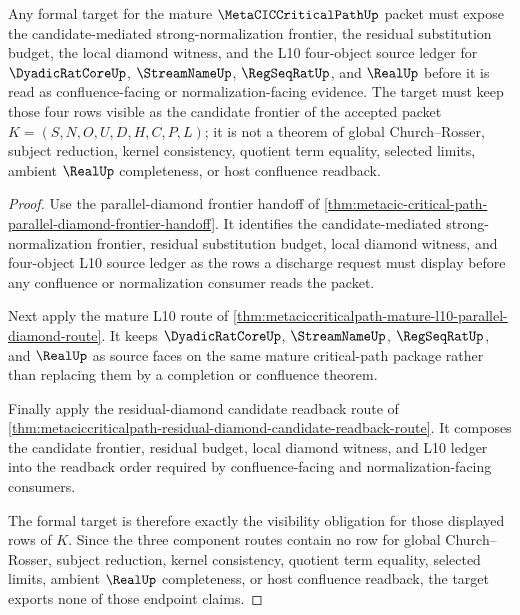 \begin{theorem}
\label{thm:metacic-critical-path-parallel-diamond-candidate-frontier-formal-target}
Any formal target for the mature $\MetaCICCriticalPathUp$ packet must expose the candidate-mediated strong-normalization frontier, the residual substitution budget, the local diamond witness, and the L10 four-object source ledger for $\DyadicRatCoreUp$, $\StreamNameUp$, $\RegSeqRatUp$, and $\RealUp$ before it is read as confluence-facing or normalization-facing evidence. The target must keep those four rows visible as the candidate frontier of the accepted packet $K=(S,N,O,U,D,H,C,P,L)$; it is not a theorem of global Church--Rosser, subject reduction, kernel consistency, quotient term equality, selected limits, ambient $\RealUp$ completeness, or host confluence readback.
\end{theorem}
\begin{proof}
Use the parallel-diamond frontier handoff of \autoref{thm:metacic-critical-path-parallel-diamond-frontier-handoff}. It identifies the candidate-mediated strong-normalization frontier, residual substitution budget, local diamond witness, and four-object L10 source ledger as the rows a discharge request must display before any confluence or normalization consumer reads the packet.

Next apply the mature L10 route of \autoref{thm:metaciccriticalpath-mature-l10-parallel-diamond-route}. It keeps $\DyadicRatCoreUp$, $\StreamNameUp$, $\RegSeqRatUp$, and $\RealUp$ as source faces on the same mature critical-path package rather than replacing them by a completion or confluence theorem.

Finally apply the residual-diamond candidate readback route of \autoref{thm:metaciccriticalpath-residual-diamond-candidate-readback-route}. It composes the candidate frontier, residual budget, local diamond witness, and L10 ledger into the readback order required by confluence-facing and normalization-facing consumers.

The formal target is therefore exactly the visibility obligation for those displayed rows of $K$. Since the three component routes contain no row for global Church--Rosser, subject reduction, kernel consistency, quotient term equality, selected limits, ambient $\RealUp$ completeness, or host confluence readback, the target exports none of those endpoint claims.
\end{proof}

